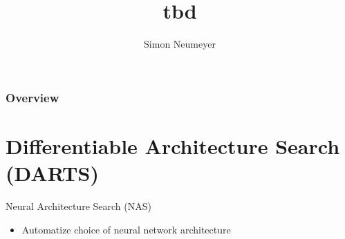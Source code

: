 \documentclass[]{beamer}
\title{tbd}
\author{Simon Neumeyer}
\date{}
\begin{document}
  {
  }
  
\begin{frame}
\frametitle{Overview}
\tableofcontents
\end{frame}

\section{Differentiable Architecture Search (DARTS)}
\begin{frame}{Neural Architecture Search (NAS)}
\begin{itemize}
\setlength{\itemsep}{10pt}
\item Automatize choice of neural network architecture
\end{itemize}
\vspace{25pt}
\begin{figure}
\end{figure}
\end{frame}
\end{document}
